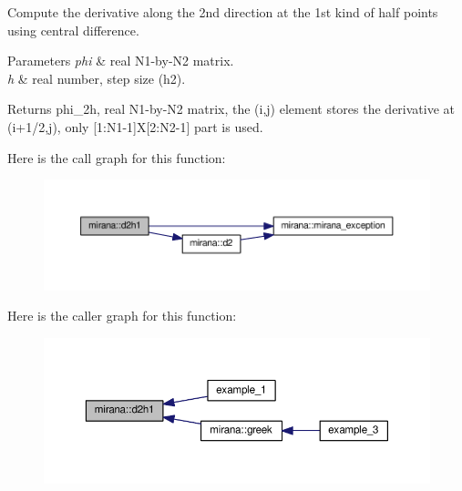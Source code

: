 Compute the derivative along the 2nd direction at the 1st kind of half points using central difference. 


\begin{DoxyParams}{Parameters}
{\em phi} & real N1-\/by-\/\+N2 matrix. \\
\hline
{\em h} & real number, step size (h2). \\
\hline
\end{DoxyParams}
\begin{DoxyReturn}{Returns}
phi\+\_\+2h, real N1-\/by-\/\+N2 matrix, the (i,j) element stores the derivative at (i+1/2,j), only \mbox{[}1\+:N1-\/1\mbox{]}X\mbox{[}2\+:N2-\/1\mbox{]} part is used. 
\end{DoxyReturn}


Here is the call graph for this function\+:\nopagebreak
\begin{figure}[H]
\begin{center}
\leavevmode
\includegraphics[width=350pt]{namespacemirana_a9341f957abd27c5132c557ae873055bd_cgraph}
\end{center}
\end{figure}




Here is the caller graph for this function\+:\nopagebreak
\begin{figure}[H]
\begin{center}
\leavevmode
\includegraphics[width=350pt]{namespacemirana_a9341f957abd27c5132c557ae873055bd_icgraph}
\end{center}
\end{figure}


\hypertarget{namespacemirana_a4f47c93df57dd51d1414b2514fd1b339}{}
